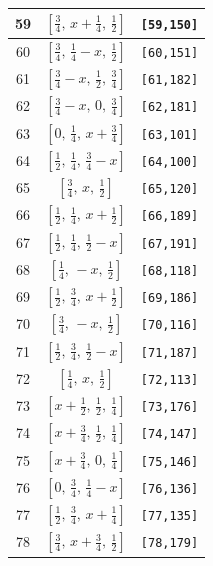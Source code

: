 \documentclass[fleqn,8pt]{jsarticle}
\begin{document}
\begin{longtable}{ccc}
59 & $\left[ \frac{3}{4},\, x + \frac{1}{4},\, \frac{1}{2} \right]$ & {\tt [59,150]} \\ \hline
60 & $\left[ \frac{3}{4},\, \frac{1}{4} - x,\, \frac{1}{2} \right]$ & {\tt [60,151]} \\ \hline
61 & $\left[ \frac{3}{4} - x,\, \frac{1}{2},\, \frac{3}{4} \right]$ & {\tt [61,182]} \\ \hline
62 & $\left[ \frac{3}{4} - x,\, 0,\, \frac{3}{4} \right]$ & {\tt [62,181]} \\ \hline
63 & $\left[ 0,\, \frac{1}{4},\, x + \frac{3}{4} \right]$ & {\tt [63,101]} \\ \hline
64 & $\left[ \frac{1}{2},\, \frac{1}{4},\, \frac{3}{4} - x \right]$ & {\tt [64,100]} \\ \hline
65 & $\left[ \frac{3}{4},\, x,\, \frac{1}{2} \right]$ & {\tt [65,120]} \\ \hline
66 & $\left[ \frac{1}{2},\, \frac{1}{4},\, x + \frac{1}{2} \right]$ & {\tt [66,189]} \\ \hline
67 & $\left[ \frac{1}{2},\, \frac{1}{4},\, \frac{1}{2} - x \right]$ & {\tt [67,191]} \\ \hline
68 & $\left[ \frac{1}{4},\, - x,\, \frac{1}{2} \right]$ & {\tt [68,118]} \\ \hline
69 & $\left[ \frac{1}{2},\, \frac{3}{4},\, x + \frac{1}{2} \right]$ & {\tt [69,186]} \\ \hline
70 & $\left[ \frac{3}{4},\, - x,\, \frac{1}{2} \right]$ & {\tt [70,116]} \\ \hline
71 & $\left[ \frac{1}{2},\, \frac{3}{4},\, \frac{1}{2} - x \right]$ & {\tt [71,187]} \\ \hline
72 & $\left[ \frac{1}{4},\, x,\, \frac{1}{2} \right]$ & {\tt [72,113]} \\ \hline
73 & $\left[ x + \frac{1}{2},\, \frac{1}{2},\, \frac{1}{4} \right]$ & {\tt [73,176]} \\ \hline
74 & $\left[ x + \frac{3}{4},\, \frac{1}{2},\, \frac{1}{4} \right]$ & {\tt [74,147]} \\ \hline
75 & $\left[ x + \frac{3}{4},\, 0,\, \frac{1}{4} \right]$ & {\tt [75,146]} \\ \hline
76 & $\left[ 0,\, \frac{3}{4},\, \frac{1}{4} - x \right]$ & {\tt [76,136]} \\ \hline
77 & $\left[ \frac{1}{2},\, \frac{3}{4},\, x + \frac{1}{4} \right]$ & {\tt [77,135]} \\ \hline
78 & $\left[ \frac{3}{4},\, x + \frac{3}{4},\, \frac{1}{2} \right]$ & {\tt [78,179]} \\ \hline

\end{longtable}
\end{document}
